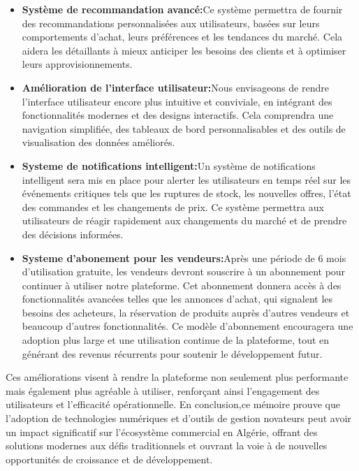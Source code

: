 \documentclass[edit,12pt,a4paper,ChapStyle,oneside,doubleinterligne]{report}
\begin{document}
\begin{itemize}
    \item \textbf{Système de recommandation avancé:}Ce système permettra de fournir des recommandations personnalisées aux utilisateurs, basées sur leurs comportements d'achat, leurs préférences et les tendances du marché. Cela aidera les détaillants à mieux anticiper les besoins des clients et à optimiser leurs approvisionnements.
    \item \textbf{Amélioration de l'interface utilisateur:}Nous envisageons de rendre l'interface utilisateur encore plus intuitive et conviviale, en intégrant des fonctionnalités modernes et des designs interactifs. Cela comprendra une navigation simplifiée, des tableaux de bord personnalisables et des outils de visualisation des données améliorés.
    \item \textbf{Systeme de notifications intelligent:}Un système de notifications intelligent sera mis en place pour alerter les utilisateurs en temps réel sur les événements critiques tels que les ruptures de stock, les nouvelles offres, l’état des commandes et les changements de prix. Ce système permettra aux utilisateurs de réagir rapidement aux changements du marché et de prendre des décisions informées.
    \item \textbf{Systeme d’abonement pour les vendeurs:}Après une période de 6 mois d'utilisation gratuite, les vendeurs devront souscrire à un abonnement pour continuer à utiliser notre plateforme. Cet abonnement donnera accès à des fonctionnalités avancées telles que les annonces d'achat, qui signalent les besoins des acheteurs, la réservation de produits auprès d'autres vendeurs et beaucoup d'autres fonctionnalités. Ce modèle d’abonnement encouragera une adoption plus large et une utilisation continue de la plateforme, tout en générant des revenus récurrents pour soutenir le développement futur.
\end{itemize}

Ces améliorations visent à rendre la plateforme non seulement plus performante mais également plus agréable à utiliser, renforçant ainsi l'engagement des utilisateurs et l'efficacité opérationnelle.
\newline \newline 
En conclusion,ce mémoire prouve que l'adoption de technologies numériques et d'outils de gestion novateurs peut avoir un impact significatif sur l'écosystème commercial en Algérie, offrant des solutions modernes aux défis traditionnels et ouvrant la voie à de nouvelles opportunités de croissance et de développement.
\end{document}
